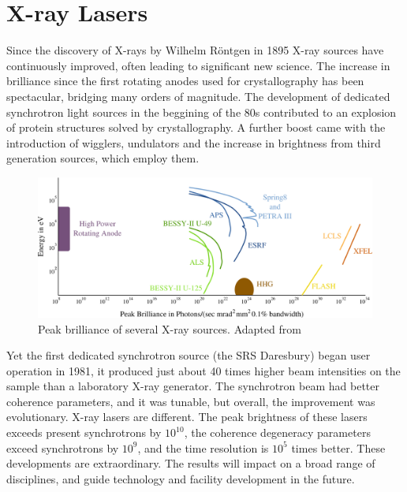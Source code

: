\chapter{X-ray Lasers}
\label{Ultrashort X-ray Sources}\noindent
 
Since the discovery of X-rays by Wilhelm R\"{o}ntgen in 1895 X-ray sources have
continuously improved, often leading to significant new science. The increase in
brilliance since the first rotating anodes used for crystallography has been
spectacular, bridging many orders of magnitude. The development of dedicated
synchrotron light sources in the beggining of the 80s contributed to an explosion of
protein structures solved by crystallography. A further boost came with
the introduction of wigglers, undulators and the increase in brightness from
third generation sources, which employ them.

 
\begin{figure}[h]
\centering
  \includegraphics[width=1.0 \columnwidth]{brilliance.png}
  \caption{Peak brilliance of several X-ray sources. 
    Adapted from \cite{Ackermann2007Operation,Materlik2001TESLA}}
  \label{Fig:Brilliance}
\end{figure}

Yet the first dedicated synchrotron source (the SRS Daresbury) began user
operation in 1981, it produced just about 40 times higher beam intensities on the
sample than a laboratory X-ray generator. The synchrotron beam had better
coherence parameters, and it was tunable, but overall, the improvement was
evolutionary. X-ray lasers are different. The peak brightness of these lasers
exceeds present synchrotrons by $10^{10}$, the coherence degeneracy parameters exceed
synchrotrons by $10^9$, and the time resolution is $10^5$ times better. These
developments are extraordinary. The results will impact on a broad range of
disciplines, and guide technology and facility development in the future. 
 
